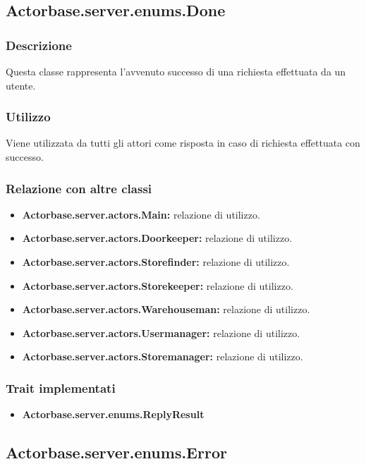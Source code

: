 \documentclass[a4paper]{article}
\begin{document}
		\subsection{Actorbase.server.enums.Done}
			\subsubsection{Descrizione}
				Questa classe rappresenta l'avvenuto successo di una richiesta effettuata da un utente.
				
			\subsubsection{Utilizzo}
				Viene utilizzata da tutti gli attori come risposta in caso di richiesta effettuata con successo.
				
			\subsubsection{Relazione con altre classi}
				\begin{itemize}
					\item \textbf{Actorbase.server.actors.Main:} relazione di utilizzo.
					\item \textbf{Actorbase.server.actors.Doorkeeper:} relazione di utilizzo.
					\item \textbf{Actorbase.server.actors.Storefinder:} relazione di utilizzo.
					\item \textbf{Actorbase.server.actors.Storekeeper:} relazione di utilizzo.
					\item \textbf{Actorbase.server.actors.Warehouseman:} relazione di utilizzo.
					\item \textbf{Actorbase.server.actors.Usermanager:} relazione di utilizzo.
					\item \textbf{Actorbase.server.actors.Storemanager:} relazione di utilizzo.
				\end{itemize}
		
			\subsubsection{Trait implementati}
				\begin{itemize}
					\item \textbf{Actorbase.server.enums.ReplyResult} 
				\end{itemize}
				
		\subsection{Actorbase.server.enums.Error}
\end{document}
